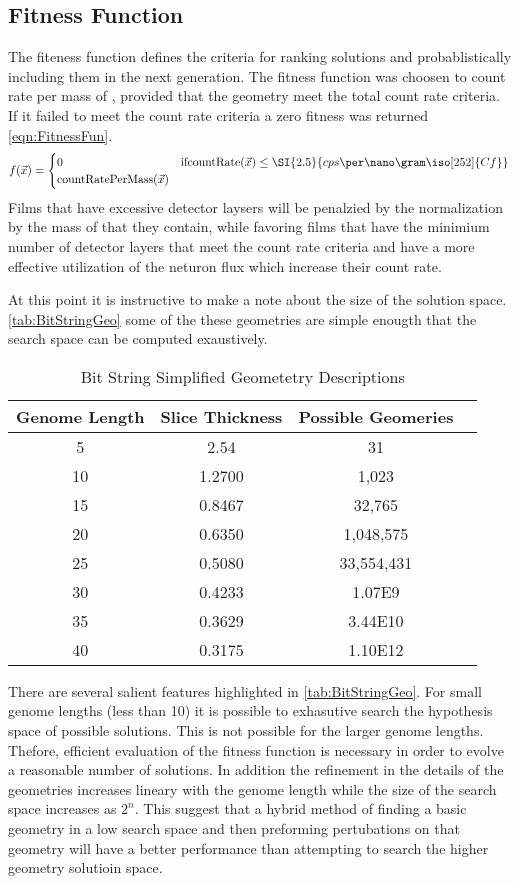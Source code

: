 \subsection{Fitness Function}
\label{sec:FitnessFunc}
The fiteness function defines the criteria for ranking solutions and probablistically including them in the next generation.
The fitness function was choosen to count rate per mass of , provided that the geometry meet the total count rate criteria.
If it failed to meet the count rate criteria a zero fitness was returned \eqref{eqn:FitnessFun}.
\begin{align}
    \label{eqn:FitnessFun}
    f(\vec{x})
    = \begin{cases}
    0 & \text{if} \text{countRate}(\vec{x}) \leq \SI{2.5}{cps\per\nano\gram\iso[252]{Cf}} \\
    \text{countRatePerMass}(\vec{x})
    \end{cases}
\end{align}
Films that have excessive detector laysers will be penalzied by the normalization by the mass of  that they contain, while favoring films that have the minimium number of detector layers that meet the count rate criteria and have a more effective utilization of the neturon flux which increase their count rate.

At this point it is instructive to make a note about the size of the solution space.
\autoref{tab:BitStringGeo} some of the these geometries are simple enougth that the search space can be computed exaustively.
\begin{table}
    \caption[Genome Bit String Geometries]{Bit String Simplified Geometetry Descriptions}
    \label{tab:BitStringGeo}
    \centering
    \begin{tabular}{ c | c cc}
     \toprule
     Genome Length&Slice Thickness&Possible Geomeries \\
     \midrule
        5&2.54&31\\
        10&1.2700&1,023\\
        15&0.8467&32,765\\
        20&0.6350&1,048,575\\
        25&0.5080&33,554,431\\
        30&0.4233&\num{1.07E9}\\
        35&0.3629&\num{3.44E10}\\
        40&0.3175&\num{1.10E12}
    \bottomrule
    \end{tabular}
\end{table}
There are several salient features highlighted in \autoref{tab:BitStringGeo}.
For small genome lengths (less than 10) it is possible to exhasutive search the hypothesis space of possible solutions.
This is not possible for the larger genome lengths.
Thefore, efficient evaluation of the fitness function is necessary in order to evolve a reasonable number of solutions.
In addition the refinement in the details of the geometries increases lineary with the genome length while the size of the search space increases as $2^n$.
This suggest that a hybrid method of finding a basic geometry in a low search space and then preforming pertubations on that geometry will have a better performance than attempting to search the higher geometry solutioin space.

